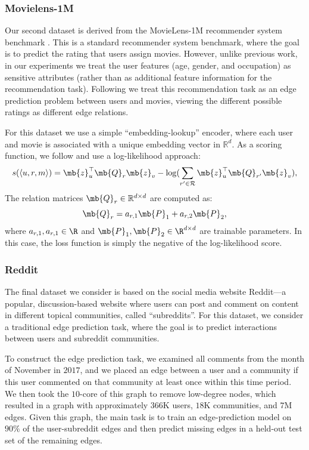 \subsubsection*{Movielens-1M}
\vspace{-2mm}
Our second dataset is derived from the MovieLens-1M recommender system benchmark \cite{harper2016movielens}.
This is a standard recommender system benchmark, where the goal is to predict the rating that users assign movies.
However, unlike previous work, in our experiments we treat the user features (age, gender, and occupation) as sensitive attributes (rather than as additional feature information for the recommendation task). 
Following \citet{berg2017graph} we treat this recommendation task as an edge prediction problem between users and movies, viewing the different possible ratings as different edge relations. 

For this dataset we use a simple ``embedding-lookup'' encoder, where each user and movie is associated with a unique embedding vector in $\mathbb{R}^d$.
As a scoring function, we follow \citet{berg2017graph} and use a  log-likelihood approach:
\begin{equation*}
    s(\langle u, r, m \rangle) = \mb{z}_u^\top\mb{Q}_r\mb{z}_v-\log(\sum_{r' \in \mathcal{R}}\mb{z}_u^\top\mb{Q}_{r'}\mb{z}_v),
\end{equation*}
The relation matrices $\mb{Q}_r \in \mathbb{R}^{d \times d}$ are computed as:
\begin{equation*}
    \mb{Q}_r = a_{r, 1}\mb{P}_1 + a_{r,2}\mb{P}_2, 
\end{equation*}
where $a_{r, 1}, a_{r, 1} \in \R$ and $\mb{P}_1, \mb{P}_2 \in \R^{d \times d}$ are trainable parameters. 
In this case, the loss function is simply the negative of the log-likelihood score. 

\subsubsection*{Reddit}
\vspace{-2mm}
The final dataset we consider is based on the social media website Reddit---a popular, discussion-based website where users can post and comment on content in different topical communities, called ``subreddits''. 
For this dataset, we consider a traditional edge prediction task, where the goal is to predict interactions between users and subreddit communities. 

To construct the edge prediction task, we examined all comments from the month of November in $2017$, and we placed an edge between a user and a community if this user commented on that community at least once within this time period. 
We then took the $10$-core of this graph to remove low-degree nodes, which resulted in a graph with approximately $366$K users, $18$K communities, and $7$M edges.
Given this graph, the main task is to train an edge-prediction model on $90\%$ of the user-subreddit edges and then predict missing edges in a held-out test set of the remaining edges.  

